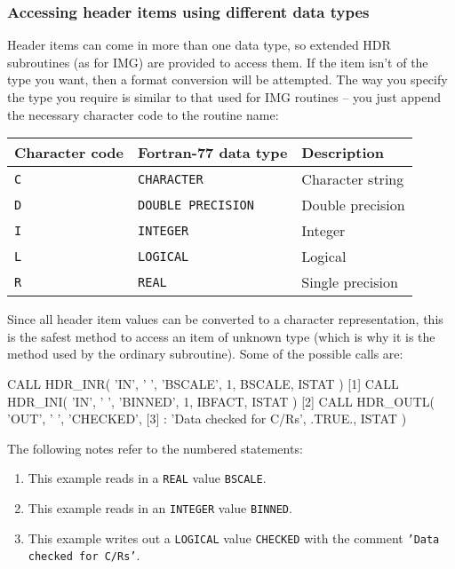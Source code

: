 \documentclass[twoside,11pt,nolof]{starlink}
\providecommand{\myverb}[1]{{\texttt{#1}}}
\providecommand{\mynote}{The following notes refer to the numbered statements:}
\newenvironment{code}{\begin{small}}
                     {\end{small}}
\newenvironment{enumnotes}
{
   \renewcommand{\labelenumi}{\myverb{[\theenumi]}}
   \begin{enumerate}
}{
   \end{enumerate}
   \renewcommand{\labelenumi}{\theenumi}
}
\begin{document}
\subsubsection{Accessing header items using different data types}
Header items can come in more than one data type, so extended HDR
subroutines (as for IMG) are provided to access them. If the item
isn't of the type you want, then a format conversion will be
attempted. The way you specify the type you require is similar to
that used for IMG routines -- you just append the necessary character
code to the routine name:
\begin{small}
\begin{center}
\begin{tabular}{||l|l|l||}
\hline
Character code & Fortran-77 data type      &  Description      \\
\hline
 \myverb{C}    & \myverb{CHARACTER}        &  Character string \\
 \myverb{D}    & \myverb{DOUBLE PRECISION} &  Double precision \\
 \myverb{I}    & \myverb{INTEGER}          &  Integer          \\
 \myverb{L}    & \myverb{LOGICAL}          &  Logical          \\
 \myverb{R}    & \myverb{REAL}             &  Single precision \\
\hline
\end{tabular}
\end{center}
\end{small}
Since all header item values can be converted to a character
representation, this is the safest method to access an item of unknown
type (which is why it is the method used by the ordinary
\htmlref{\myverb{HDR\_IN}}{HDR_IN[x]} subroutine). Some of the possible calls are:
\begin{code}
\begin{terminalv}
     CALL HDR_INR( 'IN', ' ', 'BSCALE', 1, BSCALE, ISTAT )    [1]
     CALL HDR_INI( 'IN', ' ', 'BINNED', 1, IBFACT, ISTAT )    [2]
     CALL HDR_OUTL( 'OUT', ' ', 'CHECKED',                    [3]
     :              'Data checked for C/Rs', .TRUE., ISTAT )
\end{terminalv}
\end{code}
\mynote
\begin{enumnotes}
\item This example reads in a \myverb{REAL} value \myverb{BSCALE}.

\item This example reads in an \myverb{INTEGER} value \myverb{BINNED}.

\item This example writes out a \myverb{LOGICAL} value
\myverb{CHECKED} with the comment \myverb{'Data checked for C/Rs'}.
\end{enumnotes}
\end{document}
